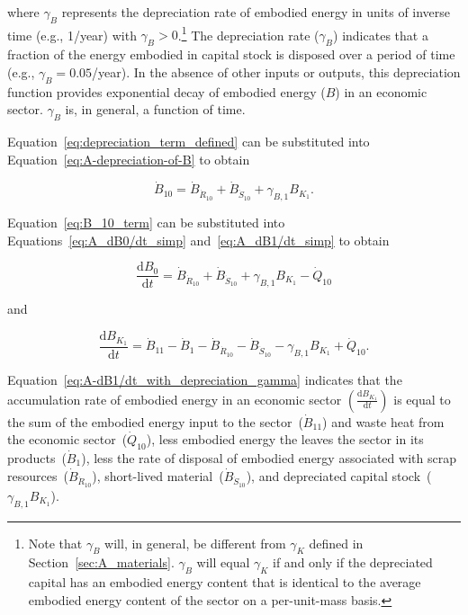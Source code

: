 \noindent{}where $\gamma_{B}$ represents the depreciation rate 
of embodied energy in units of inverse time (e.g., 1/year) 
with $\gamma_{B} > 0$.\footnote{Note that $\gamma_B$ will, in general,
be different from $\gamma_{K}$ defined in Section~\ref{sec:A_materials}.
$\gamma_{B}$ will equal $\gamma_{K}$ if and only if 
the depreciated capital has an embodied energy content that is 
identical to the average embodied energy content 
of the sector on a per-unit-mass basis.}
The depreciation rate ($\gamma_{B}$) indicates that 
a fraction of the energy embodied in capital stock
is disposed over a period of time (e.g., $\gamma_{B} = 0.05$/year). 
In the absence of other inputs or outputs, 
this depreciation function provides exponential decay 
of embodied energy ($B$) in an economic sector. 
$\gamma_{B}$ is, in general, a function of time.

Equation~\ref{eq:depreciation_term_defined} can be substituted into
Equation~\ref{eq:A-depreciation-of-B} to obtain

\begin{equation} \label{eq:B_10_term}
	\dot{B}_{10}
	= \dot{B}_{\dot{R}_{10}}
	+ \dot{B}_{\dot{S}_{10}}
	+ \gamma_{B,1} B_{K_{1}}.	
\end{equation}

\noindent{}Equation~\ref{eq:B_10_term} 
can be substituted into Equations~\ref{eq:A_dB0/dt_simp}
and~\ref{eq:A_dB1/dt_simp} to obtain 

\begin{equation} \label{eq:A-dB0/dt_with_depreciation_gamma}
	\frac{\mathrm{d}B_{0}}{\mathrm{d}t} 
	= \dot{B}_{\dot{R}_{10}}
	+ \dot{B}_{\dot{S}_{10}}
	+ \gamma_{B,1} B_{K_{1}}
	- \dot{Q}_{10} 
\end{equation}

\noindent{}and

\begin{equation} \label{eq:A-dB1/dt_with_depreciation_gamma}
	\frac{\mathrm{d}B_{K_{1}}}{\mathrm{d}t} 
	= \dot{B}_{11}
	- \dot{B}_{1}
	- \dot{B}_{\dot{R}_{10}}
	- \dot{B}_{\dot{S}_{10}}
	- \gamma_{B,1} B_{K_{1}}
	+ \dot{Q}_{10}.
\end{equation}

\noindent{}Equation~\ref{eq:A-dB1/dt_with_depreciation_gamma} 
indicates that the accumulation rate 
of embodied energy in an economic sector 
$\left( \frac{\mathrm{d}B_{K_{1}}}{\mathrm{d}t} \right)$
is equal to the sum of the embodied energy input to the sector~($\dot{B}_{11}$)
and waste heat from the economic sector~($\dot{Q}_{10}$),
less embodied energy the leaves the sector in its products~($\dot{B}_{1}$), 
less the rate of disposal of embodied energy associated with 
scrap resources~($\dot{B}_{\dot{R}_{10}}$),
short-lived material~($\dot{B}_{\dot{S}_{10}}$), and
depreciated capital stock~($\gamma_{B,1} B_{K_{1}}$).

